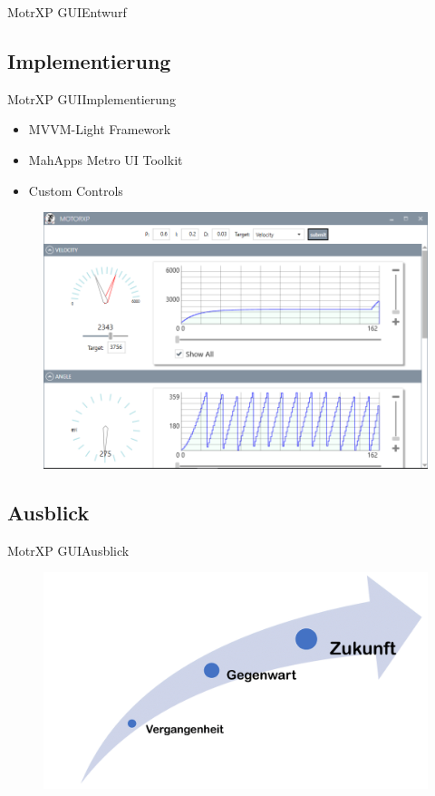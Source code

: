 \begin{frame}{MotrXP GUI}{Entwurf}
	  		
		\end{frame}
	\subsection{Implementierung}
		\begin{frame}{MotrXP GUI}{Implementierung}
		\begin{minipage}{0.5\textwidth}
			\begin{itemize}
				\item MVVM-Light Framework
				\item MahApps Metro UI Toolkit
				\item Custom Controls 
			\end{itemize}
		\end{minipage}
		\hfill
		\begin{minipage}{0.4\textwidth}
			\begin{figure}[h]
	  			\centering
	  				\includegraphics[width=\textwidth]{../gui/Bilder/GUIScreenshot2.png}
	  		\end{figure}
		\end{minipage}
	  		
		\end{frame}

	\subsection{Ausblick}
		\begin{frame}{MotrXP GUI}{Ausblick}
\begin{figure}
	  			\centering
	  				\includegraphics[width=\textwidth]{../gui/Bilder/AusblickPfeil.png}
	  		\end{figure}
		\end{frame}